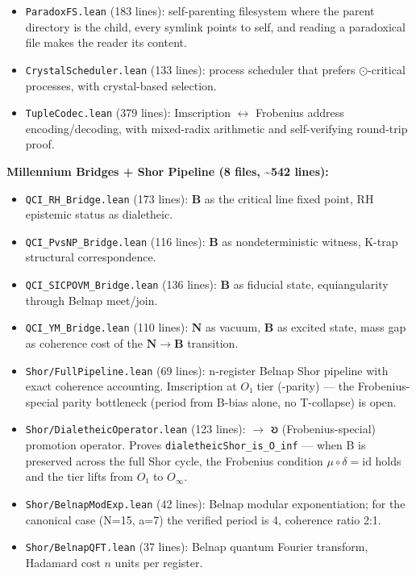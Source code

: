 \documentclass[10pt,a4paper]{article}
\begin{document}
\begin{itemize}
    \item \texttt{ParadoxFS.\allowbreak lean} (183 lines): self-parenting filesystem where the parent directory is the child, every symlink points to self, and reading a paradoxical file makes the reader its content.
    \item \texttt{CrystalScheduler.\allowbreak lean} (133 lines): process scheduler that prefers $\odot$-critical processes, with crystal-based selection.
    \item \texttt{TupleCodec.\allowbreak lean} (379 lines): Imscription $\leftrightarrow$ Frobenius address encoding/decoding, with mixed-radix arithmetic and self-verifying round-trip proof.
\end{itemize}

\textbf{Millennium Bridges + Shor Pipeline (8 files, \textasciitilde{}542 lines):}

\begin{itemize}
    \item \texttt{QCI\_\allowbreak RH\_\allowbreak Bridge.\allowbreak lean} (173 lines): $\mathbf{B}$ as the critical line fixed point, RH epistemic status as dialetheic.
    \item \texttt{QCI\_\allowbreak PvsNP\_\allowbreak Bridge.\allowbreak lean} (116 lines): $\mathbf{B}$ as nondeterministic witness, K-trap structural correspondence.
    \item \texttt{QCI\_\allowbreak SICPOVM\_\allowbreak Bridge.\allowbreak lean} (136 lines): $\mathbf{B}$ as fiducial state, equiangularity through Belnap meet/join.
    \item \texttt{QCI\_\allowbreak YM\_\allowbreak Bridge.\allowbreak lean} (110 lines): $\mathbf{N}$ as vacuum, $\mathbf{B}$ as excited state, mass gap as coherence cost of the $\mathbf{N} \to \mathbf{B}$ transition.
    \item \texttt{Shor/\allowbreak FullPipeline.\allowbreak lean} (69 lines): n-register Belnap Shor pipeline with exact coherence accounting. Imscription at $O₁$ tier (\psi-parity) --- the Frobenius-special parity bottleneck (period from B-bias alone, no T-collapse) is open.
    \item \texttt{Shor/\allowbreak DialetheicOperator.\allowbreak lean} (123 lines): \psi $\rightarrow$ 𐑹 (Frobenius-special) promotion operator. Proves \texttt{dialetheicShor\_\allowbreak is\_\allowbreak O\_\allowbreak inf} --- when B is preserved across the full Shor cycle, the Frobenius condition $\mu \circ \delta = \text{id}$ holds and the tier lifts from $O₁$ to $O_{\infty}$.
    \item \texttt{Shor/\allowbreak BelnapModExp.\allowbreak lean} (42 lines): Belnap modular exponentiation; for the canonical case (N=15, a=7) the verified period is 4, coherence ratio 2:1.
    \item \texttt{Shor/\allowbreak BelnapQFT.\allowbreak lean} (37 lines): Belnap quantum Fourier transform, Hadamard cost $n$ units per register.
\end{itemize}
\end{document}
